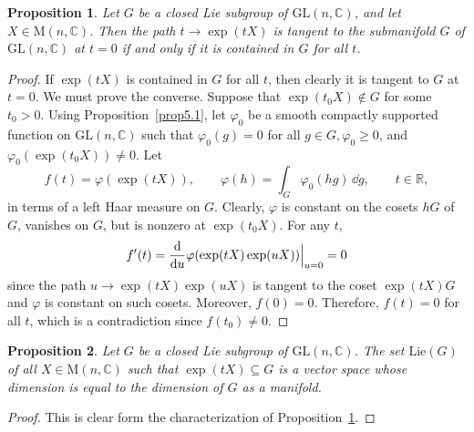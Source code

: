 \documentclass[12pt,reqno]{book}%
\newtheorem{proposition}{Proposition}[chapter]
\theoremstyle{definition}
\theoremstyle{remark}
\theoremstyle{theorem}
\theoremstyle{remark}
\renewcommand{\d}{\dd}
\begin{document}
\begin{proposition}\label{prop5.2}%
    Let $G$ be a closed Lie subgroup of $\mathrm{GL}(n, \mathbb{C})$, and let $X \in \mathrm{M}(n, \mathbb{C})$.
    Then the path $t \to \exp(tX)$ is tangent to the submanifold $G$ of $\mathrm{GL}(n, \mathbb{C})$ at $t = 0$ if and only if it is contained in $G$ for all $t$.
\end{proposition}%
\begin{proof}%
    If $\exp(tX)$ is contained in $G$ for all $t$, then clearly it is tangent to $G$ at $t = 0$.
    We must prove the converse.
    Suppose that $\exp(t_0X) \notin G$ for some $t_0 > 0$.
    Using Proposition~\ref{prop5.1}, let $\varphi_0$ be a smooth compactly supported function on $\mathrm{GL}(n, \mathbb{C})$ such that $\varphi_0(g) = 0$ for all $g \in G, \varphi_0 \geq 0$, and $\varphi_0(\exp(t_0X)) \neq 0$.
    Let
    \[
        f(t) = \varphi(\exp(tX)), \qquad \varphi(h) = \int_{G} \varphi_0(hg) \, \d g, \qquad t \in \mathbb{R},
    \]
    in terms of a left Haar measure on $G$.
    Clearly, $\varphi$ is constant on the cosets $hG$ of $G$, vanishes on $G$, but is nonzero at $\exp(t_0X)$.
    For any $t$,
    \[
        f'(t) = \dv{}{u}\varphi(\exp(tX) \exp(uX)) \Big|_{u=0} = 0
    \]
    since the path $u \to \exp(tX)\exp(uX)$ is tangent to the coset $\exp(tX)G$ and $\varphi$ is constant on such cosets.
    Moreover, $f(0) = 0$.
    Therefore, $f(t) = 0$ for all $t$, which is a contradiction since $f(t_0) \neq 0$.
\end{proof}%

\begin{proposition}\label{prop5.3}%
    Let $G$ be a closed Lie subgroup of $\mathrm{GL}(n, \mathbb{C})$.
    The set $\mathrm{Lie}(G)$ of all $X \in \mathrm{M}(n, \mathbb{C})$ such that $\exp(tX) \subseteq G$ is a vector space whose dimension is equal to the dimension of $G$ as a manifold.
\end{proposition}%
\begin{proof}%
    This is clear form the characterization of Proposition~\ref{prop5.2}.
\end{proof}%
\end{document}
